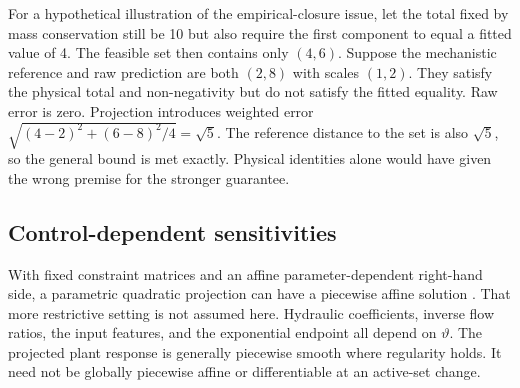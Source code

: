For a hypothetical illustration of the empirical-closure issue, let the total fixed by mass conservation still be 10 but also require the first component to equal a fitted value of 4. The feasible set then contains only $(4,6)$. Suppose the mechanistic reference and raw prediction are both $(2,8)$ with scales $(1,2)$. They satisfy the physical total and non-negativity but do not satisfy the fitted equality. Raw error is zero. Projection introduces weighted error $\sqrt{(4-2)^2+(6-8)^2/4}=\sqrt5$. The reference distance to the set is also $\sqrt5$, so the general bound is met exactly. Physical identities alone would have given the wrong premise for the stronger guarantee.

\subsection{Control-dependent sensitivities}

With fixed constraint matrices and an affine parameter-dependent right-hand side, a parametric quadratic projection can have a piecewise affine solution \citep{Tondel2003}. That more restrictive setting is not assumed here. Hydraulic coefficients, inverse flow ratios, the input features, and the exponential endpoint all depend on $\vartheta$. The projected plant response is generally piecewise smooth where regularity holds. It need not be globally piecewise affine or differentiable at an active-set change.

